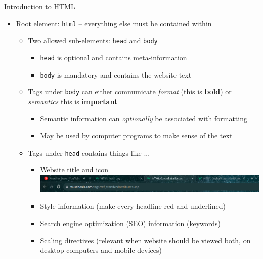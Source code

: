 \begin{frame}{Introduction to HTML}
%
\begin{itemize}
\item Root element: \texttt{html} -- everything else must be contained within
	\pause
	\begin{itemize}
	\item Two allowed sub-elements: \texttt{head} and \texttt{body}
		\begin{itemize}
		\item \texttt{head} is optional and contains meta-information
		\item \texttt{body} is mandatory and contains the website text
		\end{itemize}
	\pause
	\item Tags under \texttt{body} can either communicate \emph{format} (\zB this is \textbf{bold}) or \emph{semantics} \zB this is \textbf{important}
		\begin{itemize}
		\item Semantic information can \emph{optionally }be associated with formatting
		\item May be used by computer programs to make sense of the text
		\end{itemize}
	\pause
	\item Tags under \texttt{head} contains things like ...
		\begin{itemize}
		\item Website title and icon \\
			\vspace{3pt}
			\includegraphics[width=.8\linewidth]{./gfx/22-html-meta}
		\item Style information (\zB make every headline red and underlined)
		\item Search engine optimization (SEO) information (keywords)
		\item Scaling directives (relevant when website should be viewed both, on desktop computers and mobile devices)
		\end{itemize}
	\end{itemize}
\end{itemize}
%
\end{frame}
 


